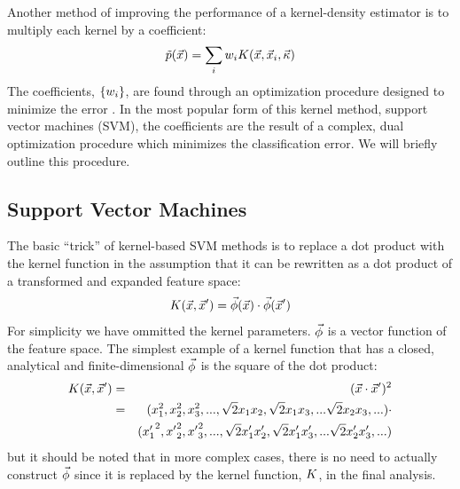 Another method of improving the performance of a kernel-density estimator
is to multiply each kernel by a coefficient:
\begin{equation}
	\tilde p(\vec {x}) = \sum_i w_i K(\vec {x}, \vec {x}_i, \vec \kappa)
	\label{weighted_kernel_estimator}
\end{equation}
The coefficients, $\lbrace w_i \rbrace$, are found through an optimization
procedure designed to minimize the error \citep{Chen_etal2015}. In the most popular
form of this kernel method, support vector machines (SVM), the coefficients
are the result of a complex, dual optimization procedure which minimizes
the classification error. We will briefly outline this procedure.

\subsection{Support Vector Machines}

The basic ``trick'' of kernel-based SVM methods is to replace a dot product
with the kernel function in the assumption that it can be rewritten
as a dot product of a transformed and expanded feature space:
\begin{equation}
	K(\vec {x}, \vec {x}^\prime) = \vec\phi(\vec {x}) \cdot \vec\phi(\vec {x}^\prime)
	\label{phi_def}
\end{equation}
For simplicity we have ommitted the kernel parameters.
$\vec\phi$ is a vector function of the feature space.
The simplest example of a kernel function that has a closed, analytical and
finite-dimensional $\vec\phi$ is the square of the dot product:
\begin{eqnarray}
	K(\vec {x}, \vec {x}^\prime) & = & (\vec {x} \cdot \vec {x}^\prime)^2 \\ \nonumber
					 & = & (x_1^2, x_2^2, x_3^2, ..., \sqrt{2} x_1 x_2, \sqrt{2} x_1 x_3, ... \sqrt{2} x_2 x_3, ...) \cdot \\ \nonumber
      & &	 ({x^\prime_1}^2, {x^\prime}_2^2, {x^\prime}_3^2, ..., \sqrt{2} x^\prime_1 x^\prime_2, \sqrt{2} x^\prime_1 x^\prime_3, ... \sqrt{2} x^\prime_2 x^\prime_3, ...) 
\end{eqnarray}
but it should be noted that in more complex cases, 
there is no need to actually construct $\vec\phi$ since it is replaced by the 
kernel function, $K$, in the final analysis.


